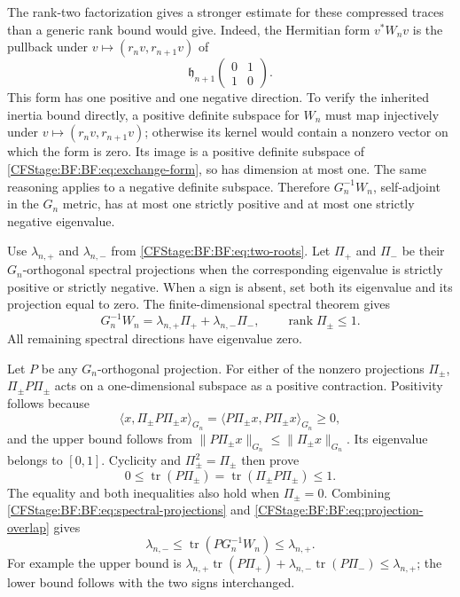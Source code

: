 The rank-two factorization gives a stronger estimate for these
compressed traces than a generic rank bound would give.
Indeed, the Hermitian form \(v^*W_nv\) is the pullback under
\(v\mapsto(r_nv,r_{n+1}v)\) of
\begin{equation}
\mathfrak h_{n+1}
\begin{pmatrix}0&1\\1&0\end{pmatrix}.
\tag{BF.31}\label{CFStage:BF:BF:eq:exchange-form}
\end{equation}
This form has one positive and one negative direction.
To verify the inherited inertia bound directly, a positive definite
subspace for \(W_n\) must map injectively under
\(v\mapsto(r_nv,r_{n+1}v)\); otherwise its kernel would contain
a nonzero vector on which the form is zero.
Its image is a positive definite subspace of
\eqref{CFStage:BF:BF:eq:exchange-form}, so has dimension at most one.
The same reasoning applies to a negative definite subspace.
Therefore \(G_n^{-1}W_n\), self-adjoint in the \(G_n\) metric,
has at most one strictly positive and at most one strictly negative
eigenvalue.

Use \(\lambda_{n,+}\) and \(\lambda_{n,-}\) from
\eqref{CFStage:BF:BF:eq:two-roots}.  Let \(\Pi_+\) and \(\Pi_-\)
be their \(G_n\)-orthogonal spectral projections when the
corresponding eigenvalue is strictly positive or strictly negative.
When a sign is absent, set both its eigenvalue and its projection
equal to zero.  The finite-dimensional spectral theorem gives
\begin{equation}
G_n^{-1}W_n
 =\lambda_{n,+}\Pi_++\lambda_{n,-}\Pi_-,
\qquad \operatorname{rank}\Pi_\pm\le1.
\tag{BF.32}\label{CFStage:BF:BF:eq:spectral-projections}
\end{equation}
All remaining spectral directions have eigenvalue zero.

Let \(P\) be any \(G_n\)-orthogonal projection.
For either of the nonzero projections \(\Pi_\pm\),
\(\Pi_\pm P\Pi_\pm\) acts on a one-dimensional subspace as a
positive contraction.  Positivity follows because
\[
\langle x,\Pi_\pm P\Pi_\pm x\rangle_{G_n}
=\langle P\Pi_\pm x,P\Pi_\pm x\rangle_{G_n}\ge0,
\]
and the upper bound follows from
\(\|P\Pi_\pm x\|_{G_n}\le\|\Pi_\pm x\|_{G_n}\).
Its eigenvalue belongs to \([0,1]\).
Cyclicity and \(\Pi_\pm^2=\Pi_\pm\) then prove
\begin{equation}
0\le\operatorname{tr}(P\Pi_\pm)
 =\operatorname{tr}(\Pi_\pm P\Pi_\pm)\le1.
\tag{BF.33}\label{CFStage:BF:BF:eq:projection-overlap}
\end{equation}
The equality and both inequalities also hold when \(\Pi_\pm=0\).
Combining \eqref{CFStage:BF:BF:eq:spectral-projections} and
\eqref{CFStage:BF:BF:eq:projection-overlap} gives
\begin{equation}
\lambda_{n,-}
\le\operatorname{tr}(P G_n^{-1}W_n)
\le\lambda_{n,+}.
\tag{BF.34}\label{CFStage:BF:BF:eq:trace-sandwich}
\end{equation}
For example the upper bound is
\(\lambda_{n,+}\operatorname{tr}(P\Pi_+)
+\lambda_{n,-}\operatorname{tr}(P\Pi_-)\le\lambda_{n,+}\);
the lower bound follows with the two signs interchanged.

